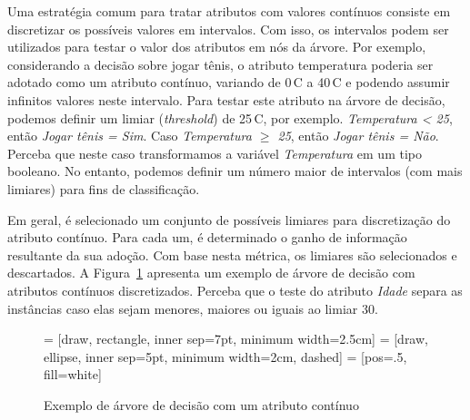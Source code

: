 Uma estratégia comum para tratar atributos com valores contínuos consiste em discretizar os possíveis valores em intervalos. Com isso, os intervalos podem ser utilizados para testar o valor dos atributos em nós da árvore. Por exemplo, considerando a decisão sobre jogar tênis, o atributo temperatura poderia ser adotado como um atributo contínuo, variando de 0\degree\,C a 40\degree\,C e podendo assumir infinitos valores neste intervalo. Para testar este atributo na árvore de decisão, podemos definir um limiar (\textit{threshold}) de 25\degree\,C, por exemplo.  \textit{Temperatura < 25}, então \textit{Jogar tênis = Sim}. Caso \textit{Temperatura $\ge$ 25}, então \textit{Jogar tênis = Não}. Perceba que neste caso transformamos a variável \textit{Temperatura} em um tipo booleano. No entanto, podemos definir um número maior de intervalos (com mais limiares) para fins de classificação.

Em geral, é selecionado um conjunto de possíveis limiares para discretização do atributo contínuo. Para cada um, é determinado o ganho de informação resultante da sua adoção. Com base nesta métrica, os limiares são selecionados e descartados. A Figura~\ref{fig:exemplo-arvore-decisao-continua} apresenta um exemplo de árvore de decisão com atributos contínuos discretizados. Perceba que o teste do atributo \textit{Idade} separa as instâncias caso elas sejam menores, maiores ou iguais ao limiar 30.

\begin{figure}[h]
	\centering
	 = [draw, rectangle, inner sep=7pt, minimum width=2.5cm]
	 = [draw, ellipse, inner sep=5pt, minimum width=2cm, dashed]
	 = [pos=.5, fill=white]
	
	
	\caption{Exemplo de árvore de decisão com um atributo contínuo}
	\label{fig:exemplo-arvore-decisao-continua}
\end{figure}

